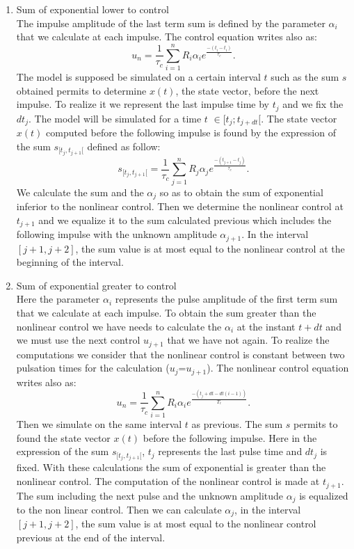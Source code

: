 \documentclass[10pt,twocolumn,letterpaper, 
]{article}
\begin{document}
\begin{enumerate}
	\item Sum of exponential lower to control \\
	
The impulse amplitude of the last term sum is defined by the parameter $\alpha_i$ that we calculate at each impulse. 
The control equation writes also as: 
\begin{equation}
 u_n=\frac{1}{\tau_c} \sum \limits_{{i=1}}^n {R_i \alpha{_i} e^{\frac{-(t_i-t_i)}{\tau_c}}}. 
\end{equation}
The model is supposed be simulated on a certain interval $t$ such as the sum $s$ obtained permits to determine $x(t)$, the state vector, before the next impulse. To realize it we represent the last impulse time by $t_j$ and we fix the $dt_j$. The model will be simulated for a time $t$ $\in [t_j ; t_{j+dt}[$. The state vector $x(t)$ computed before the following impulse is found by the expression of the sum $s_{[t_j,t_{j+1}[}$ defined as follow: 
\begin{equation}
s_{[t_j,t_{j+1}[}=\frac{1}{\tau_c}\sum \limits_{{j=1}}^n {R_j \alpha{_j} e^{\frac{-(t_{j+1}-t_j)}{\tau_c}}}.
\end{equation}
We calculate the sum and the $\alpha_j$ so as to obtain the sum of exponential inferior to the nonlinear control. Then we determine the nonlinear control at $t_{j+1}$ and we equalize it to the sum calculated previous which includes the following impulse with the unknown amplitude $\alpha_{j+1}$. In the interval $[j+1,j+2]$, the sum value is at most equal to the nonlinear control at the beginning of the interval. 

	\item Sum of exponential greater to control \\
	
	Here the parameter $\alpha_i$ represents the pulse amplitude of the first term sum that we calculate at each impulse. To obtain the sum greater than the nonlinear control we have needs to calculate the $\alpha_i$ at the instant $t+dt$ and we must use the next control $u_{j+1}$ that we have not again. To realize the computations we consider that the nonlinear control is constant between two pulsation times for the calculation ($u_j$=$u_{j+1}$). 
The nonlinear control equation writes also as: 
	\begin{equation}
 u_n=\frac{1}{\tau_c} \sum\limits_{{i=1}}^n {R_i \alpha_i e^{\frac{-(t_j+dt - dt(i-1))}{T_c}}}. 
\end{equation}
	Then we simulate on the same interval $t$ as previous. The sum $s$ permits to found the state vector $x(t)$ before the following impulse. Here in the expression of the sum $s_{[t_j,t_{j+1}[}$, $t_j$ represents the last pulse time and $dt_j$ is fixed. With these calculations the sum of exponential is greater than the nonlinear control. The computation of the nonlinear control is made at $t_{j+1}$. The sum including the next pulse and the unknown amplitude $\alpha_j$ is equalized to the non linear control. Then we can calculate $\alpha_{j}$, in the interval $[j+1,j+2]$, the sum value is at most equal to the nonlinear control previous at the end of the interval.
\end{enumerate} 
\end{document}
